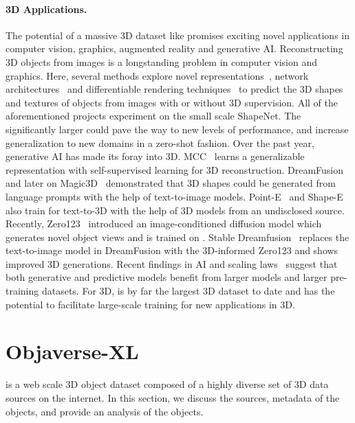 \paragraph{3D Applications.}
The potential of a massive 3D dataset like \dataset promises exciting novel applications in computer vision, graphics, augmented reality and generative AI. 
Reconstructing 3D objects from images is a longstanding problem in computer vision and graphics. 
Here, several methods explore novel representations~\cite{choy20163d,wang2018pixel2mesh,mescheder2019occupancy,mildenhall2020nerf}, network architectures~\cite{gkioxari2019mesh,yu2021pixelnerf} and differentiable rendering techniques~\cite{kato2018neural,chen2019learning,ravi2020accelerating,liu2023humans,liu2022shadows} to predict the 3D shapes and textures of objects from images with or without 3D supervision. 
All of the aforementioned projects experiment on the small scale ShapeNet. 
The significantly larger \dataset could pave the way to new levels of performance, and increase generalization to new domains in a zero-shot fashion. 
Over the past year, generative AI has made its foray into 3D. MCC~\cite{wu2023multiview} learns a generalizable representation with self-supervised learning for 3D reconstruction.
DreamFusion~\cite{poole2022dreamfusion} and later on Magic3D~\cite{lin2023magic3d} demonstrated that 3D shapes could be generated from language prompts with the help of text-to-image models. 
Point-E~\cite{nichol2022point} and Shape-E~\cite{jun2023shap} also train for text-to-3D with the help of 3D models from an undisclosed source. 
Recently, Zero123~\cite{liu2023zero1to3} introduced an image-conditioned diffusion model which generates novel object views and is trained on \datasetone. 
Stable Dreamfusion~\cite{stable-dreamfusion} replaces the text-to-image model in DreamFusion with the 3D-informed Zero123 and shows improved 3D generations. 
Recent findings in AI and scaling laws~\cite{kaplan2020scaling,hoffmann2022training} suggest that both generative and predictive models benefit from larger models and larger pre-training datasets. 
For 3D, \dataset is by far the largest 3D dataset to date and has the potential to facilitate large-scale training for new applications in 3D.
\section{Objaverse-XL}
\label{sec:obaverse}

\dataset is a web scale 3D object dataset composed of a highly diverse set of 3D data sources on the internet. In this section, we discuss the sources, metadata of the objects, and provide an analysis of the objects.

